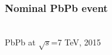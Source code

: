 \documentclass{beamer}
\begin{document}
\begin{frame}
  \frametitle{Nominal PbPb event}
 \\
PbPb at $\sqrt{s}$=7 TeV, 2015 \\
\end{frame}
\end{document}
